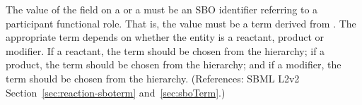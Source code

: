 The value of the  field on a \SpeciesReference or a
\ModifierSpeciesReference must be an SBO identifier referring to a
participant functional role.  That is, the value must be a term derived
from \sboparticipantfunctional.  The appropriate term depends on whether
the entity is a reactant, product or modifier.  If a reactant, the term
should be chosen from the \sboreactant hierarchy; if a product, the term
should be chosen from the \sboproduct hierarchy; and if a modifier, the
term should be chosen from the \sbomodifier hierarchy.  (References: SBML
L2v2 Section~\ref{sec:reaction-sboterm} and~\ref{sec:sboTerm}.)
